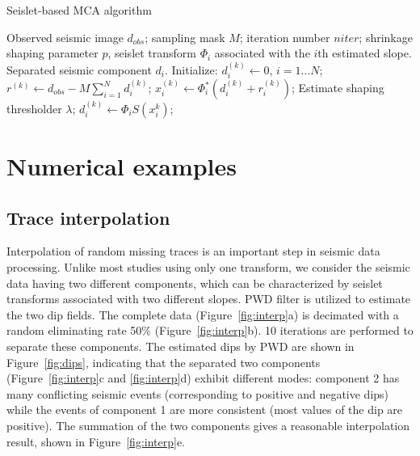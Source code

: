 
\begin{algorithm}[htb]
    \caption{Seislet-based MCA algorithm}\label{algorithm:lpmca}
    \begin{algorithmic}[1]
    \renewcommand{\algorithmicrequire}{\textbf{Input:}}
    \REQUIRE Observed seismic image $d_{obs}$; sampling mask $M$; iteration number $niter$; shrinkage shaping parameter $p$, seislet transform $\Phi_i$  associated with the $i$th estimated slope.
    \renewcommand{\algorithmicensure}{\textbf{Output:}}
    \ENSURE Separated seismic component $d_i$.
    \STATE Initialize: $d_i^{(k)}\leftarrow 0$, $ i=1\ldots N$;
            \STATE  $r^{(k)} \leftarrow d_{obs}-M\sum_{i=1}^N d_i^{(k)}$;
                \STATE  $x_i^{(k)}\leftarrow \Phi_i^*(d_i^{(k)}+r_i^{(k)})$;
                \STATE  Estimate shaping thresholder $\lambda$;
                \STATE  $d_i^{(k)}\leftarrow \Phi_i S(x_i^k) $;
            \ENDFOR
        \ENDFOR
    \end{algorithmic}
\end{algorithm}



\section{Numerical examples}

\subsection{Trace interpolation}

Interpolation of random missing traces is an important step in seismic data processing. Unlike most studies using only one transform, we consider the seismic data having two different components, which can be characterized by seislet transforms associated with two different slopes. PWD filter is utilized to estimate the two dip fields. The complete data (Figure~\ref{fig:interp}a) is decimated with a random eliminating rate 50\% (Figure~\ref{fig:interp}b). 10 iterations are performed to separate these components. The estimated dips by PWD are shown in Figure~\ref{fig:dips}, indicating that the separated two components (Figure~\ref{fig:interp}c and \ref{fig:interp}d) exhibit different modes: component 2 has many conflicting seismic events (corresponding to positive and negative dips) while the events of component 1 are more consistent (most values of the dip are positive). The summation of the two components gives a reasonable interpolation result, shown in Figure~\ref{fig:interp}e.

